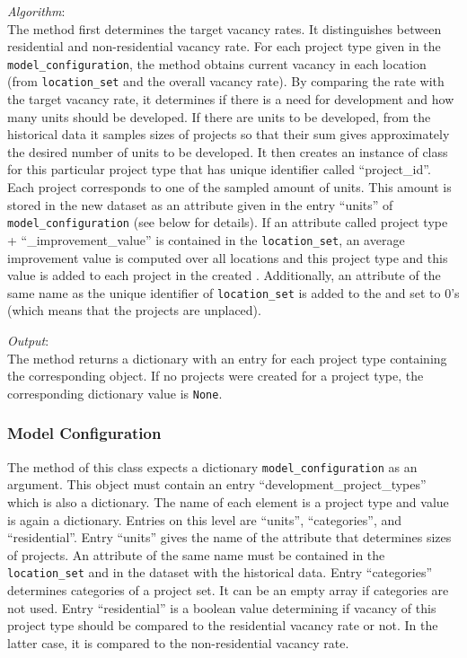 {\it Algorithm}:~\\[1mm]
The method first determines the target vacancy rates. It distinguishes between
residential and non-residential vacancy rate.  For each project type given in
the \verb|model_configuration|, \modelsindex the method obtains current vacancy in each
location (from \verb|location_set| and the overall vacancy rate). By comparing
the rate with the target vacancy rate, it determines if there is a need for
development and how many units should be developed. If there are units to be
developed, from the historical data it samples sizes of projects so that their
sum gives approximately the desired number of units to be developed. It then
creates an instance of class  for this particular
project type that has unique identifier called ``project_id''. Each project
corresponds to one of the sampled amount of units. This amount is stored in
the new dataset \datasetindex as an attribute given in the entry ``units'' of
\verb|model_configuration| \modelsindex (see below for details). If an attribute \attributesindex called
project type + ``_improvement_value'' is contained in the \verb|location_set|,
an average improvement value is computed over all locations and this project
type and this value is added to each project in the created
.  Additionally, an attribute \attributesindex of the same name as
the unique identifier of \verb|location_set| is added to the
 and set to 0's (which means that the projects
are unplaced).

{\it Output}:~\\[1mm]
The method returns a dictionary with an entry for each project type containing
the corresponding  object. If no projects were
created for a project type, the corresponding dictionary value is \verb|None|.


\subsubsection{Model Configuration}
\label{sec:DPTM-configuration}
\modelsindex
The  method of this class expects a dictionary
\verb|model_configuration| \modelsindex as an argument. This object must contain an entry
``development_project_types'' which is also a dictionary. The name of each
element is a project type and value is again a dictionary. Entries on this
level are ``units'', ``categories'', and ``residential''. Entry ``units''
gives the name of the attribute \attributesindex that determines sizes of projects. An
attribute \attributesindex of the same name must be contained in the \verb|location_set| and in
the dataset \datasetindex with the historical data. Entry ``categories'' determines
categories of a project set. It can be an empty array if categories are not
used. Entry ``residential'' is a boolean value determining if vacancy of this
project type should be compared to the residential vacancy rate or not. In the
latter case, it is compared to the non-residential vacancy rate.

